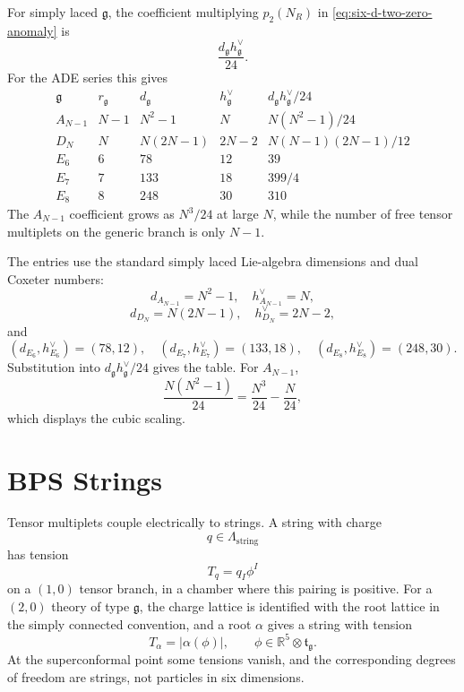 \begin{remark}
\label{rem:six-d-ade-anomaly-arithmetic}
For simply laced \(\mathfrak g\), the coefficient multiplying
\(p_2(N_R)\) in \eqref{eq:six-d-two-zero-anomaly} is
\[
  \frac{d_{\mathfrak g}h^\vee_{\mathfrak g}}{24}.
\]
For the ADE series this gives
\[
\begin{array}{c|c|c|c|c}
  \mathfrak g & r_{\mathfrak g} & d_{\mathfrak g}
  & h^\vee_{\mathfrak g}
  & d_{\mathfrak g}h^\vee_{\mathfrak g}/24\\ \hline
  A_{N-1} & N-1 & N^2-1 & N & N(N^2-1)/24\\
  D_N & N & N(2N-1) & 2N-2 & N(N-1)(2N-1)/12\\
  E_6 & 6 & 78 & 12 & 39\\
  E_7 & 7 & 133 & 18 & 399/4\\
  E_8 & 8 & 248 & 30 & 310
\end{array}
\]
The \(A_{N-1}\) coefficient grows as \(N^3/24\) at large \(N\), while the
number of free tensor multiplets on the generic branch is only \(N-1\).

The entries use the standard simply laced Lie-algebra dimensions and dual
Coxeter numbers:
\[
  d_{A_{N-1}}=N^2-1,\quad h^\vee_{A_{N-1}}=N,
\]
\[
  d_{D_N}=N(2N-1),\quad h^\vee_{D_N}=2N-2,
\]
and
\[
  (d_{E_6},h^\vee_{E_6})=(78,12),\quad
  (d_{E_7},h^\vee_{E_7})=(133,18),\quad
  (d_{E_8},h^\vee_{E_8})=(248,30).
\]
Substitution into \(d_{\mathfrak g}h^\vee_{\mathfrak g}/24\) gives the table.
For \(A_{N-1}\),
\[
  \frac{N(N^2-1)}{24}
  =
  \frac{N^3}{24}-\frac{N}{24},
\]
which displays the cubic scaling.
\end{remark}

\section{BPS Strings}

Tensor multiplets couple electrically to strings.  A string with charge
\[
  q\in\Lambda_{\mathrm{string}}
\]
has tension
\[
  T_q=q_I\phi^I
\]
on a \((1,0)\) tensor branch, in a chamber where this pairing is positive.
For a \((2,0)\) theory of type \(\mathfrak g\), the charge lattice is
identified with the root lattice in the simply connected convention, and a
root \(\alpha\) gives a string with tension
\[
  T_\alpha=\left|\alpha(\phi)\right|,
  \qquad
  \phi\in\mathbb R^5\otimes\mathfrak t_{\mathfrak g}.
\]
At the superconformal point some tensions vanish, and the corresponding
degrees of freedom are strings, not particles in six dimensions.

